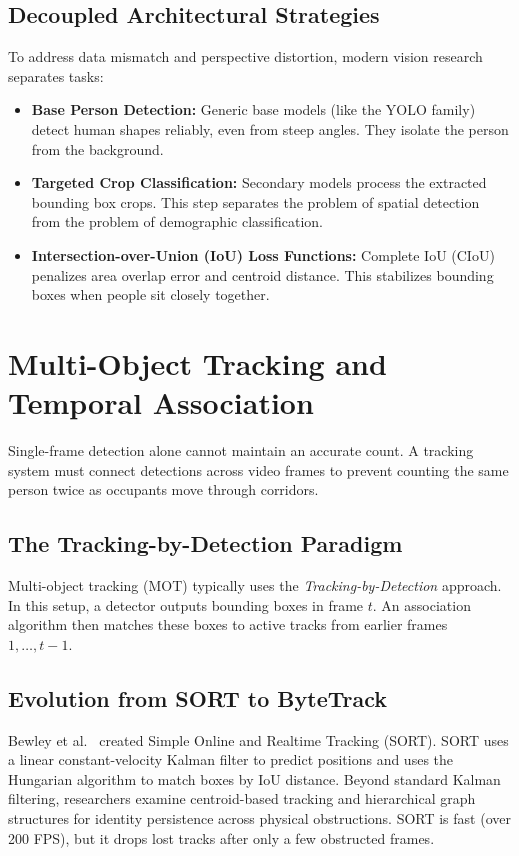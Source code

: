 \subsection{Decoupled Architectural Strategies}
To address data mismatch and perspective distortion, modern vision research separates tasks:
\begin{itemize}
    \item \textbf{Base Person Detection:} Generic base models (like the YOLO family) detect human shapes reliably, even from steep angles. They isolate the person from the background.
    \item \textbf{Targeted Crop Classification:} Secondary models process the extracted bounding box crops. This step separates the problem of spatial detection from the problem of demographic classification.
    \item \textbf{Intersection-over-Union (IoU) Loss Functions:} Complete IoU (CIoU) \cite{zheng2020ciou} penalizes area overlap error and centroid distance. This stabilizes bounding boxes when people sit closely together.
\end{itemize}

\section{Multi-Object Tracking and Temporal Association}
Single-frame detection alone cannot maintain an accurate count. A tracking system must connect detections across video frames to prevent counting the same person twice as occupants move through corridors.

\subsection{The Tracking-by-Detection Paradigm}
Multi-object tracking (MOT) typically uses the \textit{Tracking-by-Detection} approach. In this setup, a detector outputs bounding boxes in frame $t$. An association algorithm then matches these boxes to active tracks from earlier frames $1, \dots, t-1$.

\subsection{Evolution from SORT to ByteTrack}
Bewley et al.\ \cite{bewley2016sort} created Simple Online and Realtime Tracking (SORT). SORT uses a linear constant-velocity Kalman filter to predict positions and uses the Hungarian algorithm to match boxes by IoU distance. Beyond standard Kalman filtering, researchers examine centroid-based tracking \cite{ralhan2023} and hierarchical graph structures \cite{koshkina2025} for identity persistence across physical obstructions. SORT is fast (over 200 FPS), but it drops lost tracks after only a few obstructed frames.

